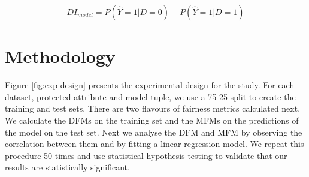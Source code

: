 \documentclass{article}
\begin{document}
\begin{equation}
  DI_{model} = P(\hat{Y}=1|D=0)-P(\hat{Y}=1|D=1)
  \label{eq:spd-model}
\end{equation}


\section{Methodology}\label{sec:method}




Figure \ref{fig:exp-design} presents the experimental design for the
study. For each dataset, protected attribute and model tuple, we use a
75-25 split to create the training and test sets. There are two
flavours of fairness metrics calculated next. We calculate the DFMs on
the training set and the MFMs on the predictions of the model on the
test set. Next we analyse the DFM and MFM by observing the correlation
between them and by fitting a linear regression model. We repeat this
procedure 50 times and use statistical hypothesis testing to validate
that our results are statistically significant.
\end{document}
